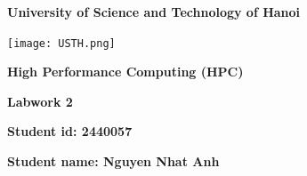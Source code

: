 \documentclass[12pt]{article}
\begin{document}
\thispagestyle{empty} %
\begin{center}
    \vspace{7pt}
    \fontsize{18pt}{17pt}\selectfont 
    \textbf{University of Science and Technology of Hanoi}
    \vspace{7pt}
\end{center}
\vspace{10pt}
\begin{center}
    \texttt{[image: USTH.png]}
\end{center}

\vspace{90pt}

\begin{center}
    \fontsize{30pt}{17pt}\selectfont 
    \textbf{High Performance Computing (HPC)}\\[3em]
    \vspace{50pt}

    \fontsize{20pt}{17pt}\selectfont 
    \textbf{Labwork 2}
    \vspace{50pt}


    \fontsize{17pt}{17pt}\selectfont
    \textbf{{Student id: }{2440057}}
    \vspace{15pt}

    \fontsize{17pt}{17pt}\selectfont
    \textbf{{Student name: }{Nguyen Nhat Anh}}
    \vspace{15pt}
    
\end{center}

\newpage

\end{document}
